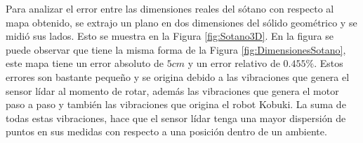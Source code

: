 Para analizar el error entre las dimensiones reales del sótano con respecto al mapa 
obtenido, se extrajo un plano en dos dimensiones del sólido geométrico y se midió sus 
lados. Esto se muestra en la Figura \ref{fig:Sotano3D}. En la figura se puede observar
que tiene la misma forma de la Figura \ref{fig:DimensionesSotano}, este mapa tiene un 
error absoluto de $5 cm$ y un error relativo de $0.455 \%$. Estos errores son bastante 
pequeño y se origina debido a las vibraciones que genera el sensor lídar al momento de 
rotar, además las vibraciones que genera el motor paso a paso y también las vibraciones 
que origina el robot Kobuki. La suma de todas estas vibraciones, hace que el sensor 
lídar tenga una mayor dispersión de puntos en sus medidas con respecto a una posición
dentro de un ambiente. 



 
